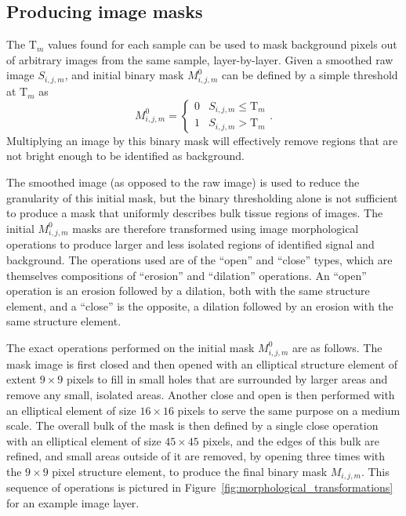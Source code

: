 \documentclass[letterpaper,11pt]{article}
\newcommand{\reffig}[1]{Figure~\ref{#1}}
\newcommand{\Tau}{\mathrm{T}}
\begin{document}
\subsection{Producing image masks}
\label{ssec:producing_image_masks}

The $\Tau_{m}$ values found for each sample can be used to mask background pixels out of arbitrary images from the same sample, layer-by-layer. Given a smoothed raw image $S_{i,j,m}$, and initial binary mask $M^{0}_{i,j,m}$ can be defined by a simple threshold at $\Tau_{m}$ as
\begin{equation}
M^{0}_{i,j,m} = 
\begin{cases} 
      0 & S_{i,j,m} \leq \Tau_{m} \\
      1 & S_{i,j,m} > \Tau_{m} 
\end{cases}
 .
\end{equation}
Multiplying an image by this binary mask will effectively remove regions that are not bright enough to be identified as background.

The smoothed image (as opposed to the raw image) is used to reduce the granularity of this initial mask, but the binary thresholding alone is not sufficient to produce a mask that uniformly describes bulk tissue regions of images. The initial $M^{0}_{i,j,m}$ masks are therefore transformed using image morphological operations \cite{opencv_mt} to produce larger and less isolated regions of identified signal and background. The operations used are of the ``open'' and ``close'' types, which are themselves compositions of ``erosion'' and ``dilation'' operations. An ``open'' operation is an erosion followed by a dilation, both with the same structure element, and a ``close'' is the opposite, a dilation followed by an erosion with the same structure element.

The exact operations performed on the initial mask $M^{0}_{i,j,m}$ are as follows. The mask image is first closed and then opened with an elliptical structure element of extent $9 \times 9$ pixels to fill in small holes that are surrounded by larger areas and remove any small, isolated areas. Another close and open is then performed with an elliptical element of size $16 \times 16$ pixels to serve the same purpose on a medium scale. The overall bulk of the mask is then defined by a single close operation with an elliptical element of size $45 \times 45$ pixels, and the edges of this bulk are refined, and small areas outside of it are removed, by opening three times with the $9 \times 9$ pixel structure element, to produce the final binary mask $M_{i,j,m}$. This sequence of operations is pictured in \reffig{fig:morphological_transformations} for an example image layer. 
\end{document}
